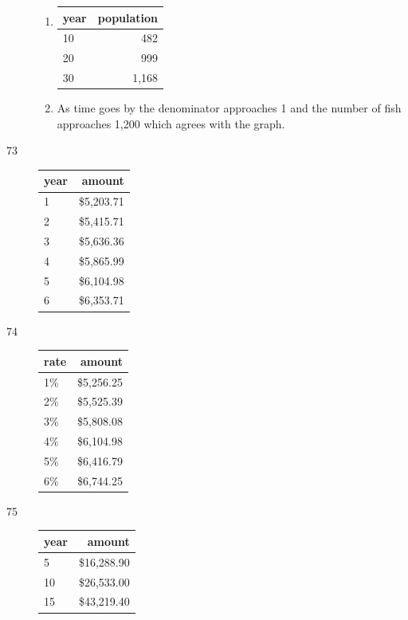\documentclass{exam}
\begin{document}
\begin{description}
\begin{enumerate}[a]
          \item
            \begin{tabular}[H]{lr}
              \toprule
              year & population \\
              \midrule
              10   & 482 \\
              20   & 999 \\
              30   & 1,168 \\
              \bottomrule
            \end{tabular}

          \item As time goes by the denominator approaches 1 and the number of fish approaches 1,200 which agrees with
            the graph.

        \end{enumerate}

      \item[73]
        \begin{tabular}[H]{lr}
          \toprule
          year & amount \\
          \midrule
          1    & \$5,203.71 \\
          2    & \$5,415.71 \\
          3    & \$5,636.36 \\
          4    & \$5,865.99 \\
          5    & \$6,104.98 \\
          6    & \$6,353.71 \\
          \bottomrule
        \end{tabular}

      \item[74]
        \begin{tabular}[H]{lr}
          \toprule
          rate & amount \\
          \midrule
          1\% & \$5,256.25 \\
          2\% & \$5,525.39 \\
          3\% & \$5,808.08 \\
          4\% & \$6,104.98 \\
          5\% & \$6,416.79 \\
          6\% & \$6,744.25 \\
          \bottomrule
        \end{tabular}

      \item[75]
        \begin{tabular}[H]{lr}
          \toprule
          year & amount \\
          \midrule
          5    & \$16,288.90 \\
          10   & \$26,533.00 \\
          15   & \$43,219.40 \\
          \bottomrule
        \end{tabular}


\end{description}
\end{document}
